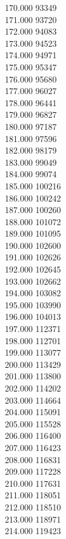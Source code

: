 { 170.000	93349 \\
 171.000	93720 \\
 172.000	94083 \\
 173.000	94523 \\
 174.000	94971 \\
 175.000	95347 \\
 176.000	95680 \\
 177.000	96027 \\
 178.000	96441 \\
 179.000	96827 \\
 180.000	97187 \\
 181.000	97596 \\
 182.000	98179 \\
 183.000	99049 \\
 184.000	99074 \\
 185.000	100216 \\
 186.000	100242 \\
 187.000	100260 \\
 188.000	101072 \\
 189.000	101095 \\
 190.000	102600 \\
 191.000	102626 \\
 192.000	102645 \\
 193.000	102662 \\
 194.000	103082 \\
 195.000	103990 \\
 196.000	104013 \\
 197.000	112371 \\
 198.000	112701 \\
 199.000	113077 \\
 200.000	113429 \\
 201.000	113800 \\
 202.000	114202 \\
 203.000	114664 \\
 204.000	115091 \\
 205.000	115528 \\
 206.000	116400 \\
 207.000	116423 \\
 208.000	116831 \\
 209.000	117228 \\
 210.000	117631 \\
 211.000	118051 \\
 212.000	118510 \\
 213.000	118971 \\
 214.000	119423 \\
}
